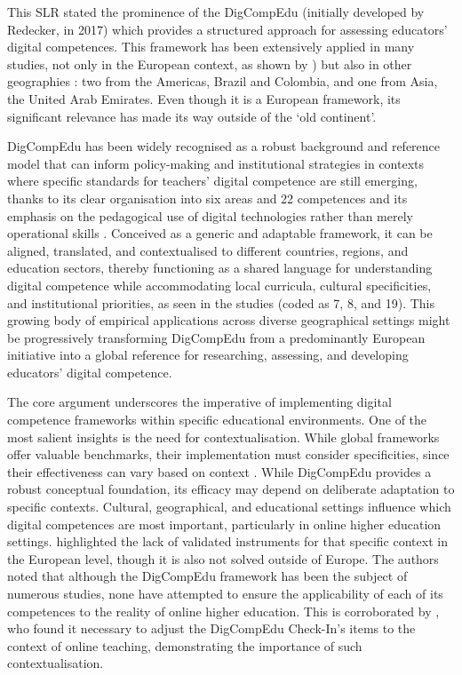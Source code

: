 \documentclass[english]{textolivre}
\begin{document}
This SLR stated the prominence of the DigCompEdu (initially developed by Redecker, in 2017) which provides a structured approach for assessing educators’ digital competences. This framework has been extensively applied in many studies, not only in the European context, as shown by \textcite{moreira2023digital,santos2024applicability}) but also in other geographies \cite{DiasTrindade2021,muammar2023evaluation,pulgarinrodriguez2025digital}: two from the Americas, Brazil and Colombia, and one from Asia, the United Arab Emirates. Even though it is a European framework, its significant relevance has made its way outside of the ‘old continent’.

DigCompEdu has been widely recognised as a robust background and reference model that can inform policy-making and institutional strategies in contexts where specific standards for teachers’ digital competence are still emerging, thanks to its clear organisation into six areas and 22 competences and its emphasis on the pedagogical use of digital technologies rather than merely operational skills \cite{redecker2017digcompedu}. Conceived as a generic and adaptable framework, it can be aligned, translated, and contextualised to different countries, regions, and education sectors, thereby functioning as a shared language for understanding digital competence while accommodating local curricula, cultural specificities, and institutional priorities, as seen in the studies (coded as 7, 8, and 19). This growing body of empirical applications across diverse geographical settings might be progressively transforming DigCompEdu from a predominantly European initiative into a global reference for researching, assessing, and developing educators’ digital competence.

The core argument underscores the imperative of implementing digital competence frameworks within specific educational environments. One of the most salient insights is the need for contextualisation. While global frameworks offer valuable benchmarks, their implementation must consider specificities, since their effectiveness can vary based on context \cite{muammar2023evaluation,silva2024fipad}. While DigCompEdu provides a robust conceptual foundation, its efficacy may depend on deliberate adaptation to specific contexts. Cultural, geographical, and educational settings influence which digital competences are most important, particularly in online higher education settings. \textcite{santos2024applicability} highlighted the lack of validated instruments for that specific context in the European level, though it is also not solved outside of Europe. The authors noted that although the DigCompEdu framework has been the subject of numerous studies, none have attempted to ensure the applicability of each of its competences to the reality of online higher education. This is corroborated by \textcite{moreira2023digital}, who found it necessary to adjust the DigCompEdu Check-In’s items to the context of online teaching, demonstrating the importance of such contextualisation.
\end{document}
